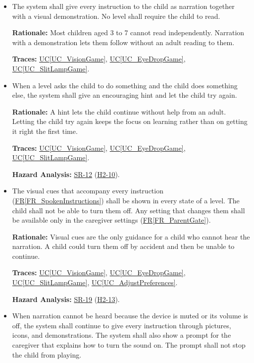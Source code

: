 \documentclass[12pt]{article}
\newcommand{\ucref}[1]{\hyperref[#1]{UC\ref*{#1}}}
\newcounter{reqnum} %
\newcommand{\rref}[1]{\hyperref[#1]{FR\ref*{#1}}}
\newcommand{\haurl}{https://team-hindsight.github.io/ophthamology-game/HazardAnalysis/HazardAnalysis.pdf}
\newcommand{\hasrref}[2]{\href{\haurl\#nameddest=sr:#1}{SR-#2}}
\newcommand{\hahazref}[2]{\href{\haurl\#nameddest=haz:#1}{H#2}}
\newcommand{\hazsr}[4]{\hasrref{#1}{#2} (\hahazref{#3}{#4})}
\begin{document}
\begin{itemize}

\item[\refstepcounter{reqnum}\textbf{FR\thereqnum}\label{FR_SpokenInstructions}:]
The system shall give every instruction to the child as narration together with
a visual demonstration. No level shall require the child to read.

\textbf{Rationale:} Most children aged 3 to 7 cannot read independently.
Narration with a demonstration lets them follow without an adult reading to
them.

\textbf{Traces:} \ucref{UC_VisionGame}, \ucref{UC_EyeDropGame},
\ucref{UC_SlitLampGame}.

\item[\refstepcounter{reqnum}\textbf{FR\thereqnum}\label{FR_HintOnMiss}:]
When a level asks the child to do something and the child does something else,
the system shall give an encouraging hint and let the child try again.

\textbf{Rationale:} A hint lets the child continue without help from an adult.
Letting the child try again keeps the focus on learning rather than on getting
it right the first time.

\textbf{Traces:} \ucref{UC_VisionGame}, \ucref{UC_EyeDropGame},
\ucref{UC_SlitLampGame}.

\textbf{Hazard Analysis:} \hazsr{NonPunitiveFeedback}{12}{PunitiveFeedback}{2-10}.

\item[\refstepcounter{reqnum}\textbf{FR\thereqnum}\label{FR_VisualCues}:]
The visual cues that accompany every instruction
(\rref{FR_SpokenInstructions}) shall be shown in every state of a level. The
child shall not be able to turn them off. Any setting that changes them shall
be available only in the caregiver settings (\rref{FR_ParentGate}).

\textbf{Rationale:} Visual cues are the only guidance for a child who cannot hear the
narration. A child could turn them off by accident and then be unable to
continue.

\textbf{Traces:} \ucref{UC_VisionGame}, \ucref{UC_EyeDropGame},
\ucref{UC_SlitLampGame}, \ucref{UC_AdjustPreferences}.

\textbf{Hazard Analysis:} \hazsr{VisualCuesSetting}{19}{VisualCuesDisabledSetting}{2-13}.

\item[\refstepcounter{reqnum}\textbf{FR\thereqnum}\label{FR_NarrationFallback}:]
When narration cannot be heard because the device is muted or its volume
is off, the system shall continue to give every instruction through pictures,
icons, and demonstrations. The system shall also show a prompt for the
caregiver that explains how to turn the sound on. The prompt shall not stop
the child from playing.


\end{itemize}
\end{document}
